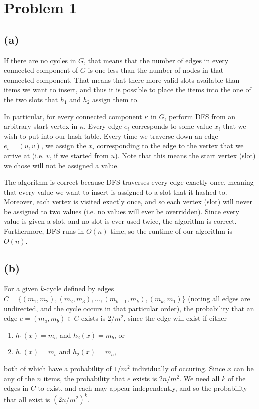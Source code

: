 \documentclass{6046}
\author{Matthew Feng}
\begin{document}
\section*{Problem 1}
\subsection*{(a)}

If there are no cycles in $G$, that means that the number of
edges in every connected component of $G$ is one less than
the number of nodes in that connected component. That means
that there more valid slots available than items we want to insert,
and thus it is possible to place the items into the one of
the two slots that $h_1$ and $h_2$ assign them to.

In particular, for every connected component $\kappa$ in $G$,
perform DFS from an arbitrary start vertex in $\kappa$.
Every edge $e_i$ corresponds to some value $x_i$ that we wish
to put into our hash table. Every time we traverse down
an edge $e_i = (u, v)$, we assign the $x_i$ corresponding to the
edge to the vertex that we arrive at (i.e. $v$, if we started
from $u$). Note that this means the start vertex (slot) we chose
will not be assigned a value.

The algorithm is correct because DFS traverses every edge
exactly once, meaning that every value we want to insert is
assigned to a slot that it hashed to. Moreover, each vertex is
visited exactly once, and so each vertex (slot) will never
be assigned to two values (i.e. no values will ever be overridden).
Since every value is given a slot, and no slot is ever used twice,
the algorithm is correct. Furthermore, DFS runs in $O(n)$ time,
so the runtime of our algorithm is $O(n)$.

\subsection*{(b)}

For a given $k$-cycle defined by edges
$C = \{(m_1, m_2), (m_2, m_3), ..., (m_{k-1}, m_k)
, (m_k, m_1)\}$ (noting all edges are undirected,
and the cycle occurs in that particular order),
the probability that an edge $e = (m_a, m_b) \in C$ exists
is $2/m^2$, since the edge will exist if either
\begin{enumerate}
    \item $h_1(x) = m_a$ and $h_2(x) = m_b$, or
    \item $h_1(x) = m_b$ and $h_2(x) = m_a$,
\end{enumerate}
both of which have a probability of $1/m^2$ individually
of occuring. Since $x$ can be any of the $n$ items, the 
probability that $e$ exists is $2n/m^2$. We need
all $k$ of the edges in $C$ to exist, and each may appear
independently, and so the probability that all exist
is $(2n/m^2)^k$.
\end{document}
